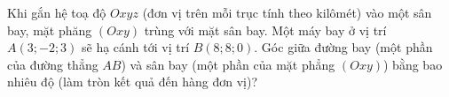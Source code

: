 \begin{bt}%

	Khi gắn hệ toạ độ $Oxyz$ (đơn vị trên mỗi trục tính theo kilômét) vào một sân bay, mặt phăng $(Oxy)$ trùng với mặt sân bay. Một máy bay ở vị trí $A(3 ; - 2 ; 3)$ sẽ hạ cánh tới vị trí $B(8 ; 8 ; 0)$. Góc giữa đường bay (một phần của đường thẳng $AB$) và sân bay (một phần của mặt phẳng $(Oxy)$) bằng bao nhiêu độ (làm tròn kết quả đến hàng đơn vị)?
\end{bt}


